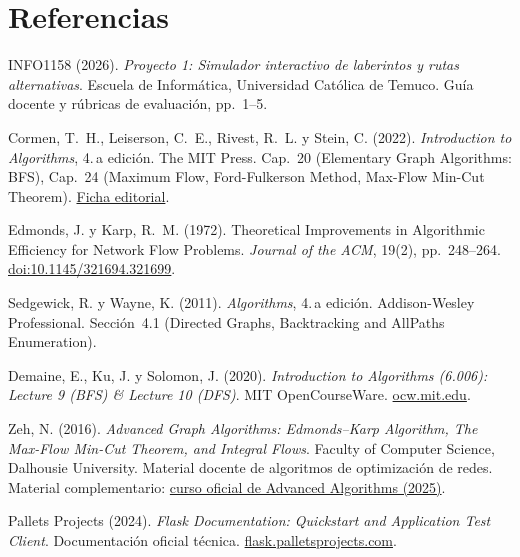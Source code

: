 \documentclass[11pt,a4paper]{article}
\begin{document}
\section{Referencias}

{\small
\begin{enumerate}[label={[\arabic*]},itemsep=4pt,topsep=2pt,leftmargin=7mm]
   INFO1158 (2026). \emph{Proyecto 1: Simulador interactivo de laberintos y rutas alternativas}. Escuela de Informática, Universidad Católica de Temuco. Guía docente y rúbricas de evaluación, pp.~1--5.

   Cormen, T.~H., Leiserson, C.~E., Rivest, R.~L. y Stein, C. (2022). \emph{Introduction to Algorithms}, 4.\,a edición. The MIT Press. Cap.~20 (Elementary Graph Algorithms: BFS), Cap.~24 (Maximum Flow, Ford-Fulkerson Method, Max-Flow Min-Cut Theorem). \href{https://mitpress.mit.edu/9780262046305/introduction-to-algorithms/}{Ficha editorial}.

   Edmonds, J. y Karp, R.~M. (1972). Theoretical Improvements in Algorithmic Efficiency for Network Flow Problems. \emph{Journal of the ACM}, 19(2), pp.~248--264. \href{https://doi.org/10.1145/321694.321699}{doi:10.1145/321694.321699}.

   Sedgewick, R. y Wayne, K. (2011). \emph{Algorithms}, 4.\,a edición. Addison-Wesley Professional. Sección~4.1 (Directed Graphs, Backtracking and AllPaths Enumeration).

   Demaine, E., Ku, J. y Solomon, J. (2020). \emph{Introduction to Algorithms (6.006): Lecture 9 (BFS) \& Lecture 10 (DFS)}. MIT OpenCourseWare. \href{https://ocw.mit.edu/courses/6-006-introduction-to-algorithms-spring-2020/}{ocw.mit.edu}.

   Zeh, N. (2016). \emph{Advanced Graph Algorithms: Edmonds--Karp Algorithm, The Max-Flow Min-Cut Theorem, and Integral Flows}. Faculty of Computer Science, Dalhousie University. Material docente de algoritmos de optimización de redes. Material complementario: \href{https://web.cs.dal.ca/~nzeh/teaching/4113+6101/}{curso oficial de Advanced Algorithms (2025)}.

   Pallets Projects (2024). \emph{Flask Documentation: Quickstart and Application Test Client}. Documentación oficial técnica. \href{https://flask.palletsprojects.com/}{flask.palletsprojects.com}.
\end{enumerate}
}
\end{document}
